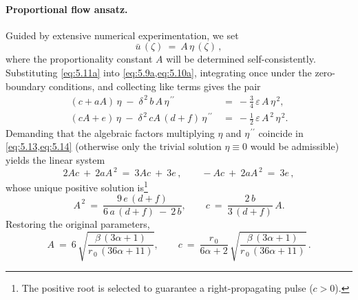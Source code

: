 \documentclass[alpha-refs, 12pt]{wiley-article}
\newcommand{\eps}{\varepsilon}
\begin{document}
\paragraph{Proportional flow ansatz.} Guided by extensive numerical experimentation, we set
\begin{equation}\label{eq:5.11a}
  \bar{u}\,(\zeta)\ =\ A\,\eta\,(\zeta)\,,
\end{equation}
where the proportionality constant $A$ will be determined self-consistently. Substituting \cref{eq:5.11a} into \cref{eq:5.9a,eq:5.10a}, integrating once under the zero-boundary conditions, and collecting like terms gives the pair
\begin{align}
  (c+aA)\,\eta \;-\;\delta^{\,2}\,b\,A\,\eta^{\,\prime\prime}\ &=\ -\frac{3}{4}\,\eps\,A\,\eta^{\,2}, \label{eq:5.13} \\
  (cA+e)\,\eta \;-\;\delta^{\,2}\,cA\,(d+f)\,\eta^{\,\prime\prime}\ &=\ -\frac{1}{2}\,\eps\,A^{\,2}\,\eta^{\,2}. \label{eq:5.14}
\end{align}
Demanding that the algebraic factors multiplying $\eta$ and $\eta^{\,\prime\prime}$ coincide in \cref{eq:5.13,eq:5.14} (otherwise only the trivial solution $\eta\equiv0$ would be admissible) yields the linear system
\begin{equation}\label{eq:compat}
  2Ac\ +\ 2aA^{\,2}\ =\ 3Ac\ +\ 3e\,, \qquad -Ac\ +\ 2aA^{\,2}\ =\ 3e\,,
\end{equation}
whose unique positive solution is\footnote{The positive root is selected to guarantee a right-propagating pulse ($c>0$).}
\begin{equation*}
  A^{\,2}\ =\ \frac{9\,e\,(d+f)}{6\,a\,(d+f)\ -\ 2\,b}, \qquad c\ =\ \frac{2\,b}{3\,(d+f)}\,A.
\end{equation*}
Restoring the original parameters,
\begin{equation*}
  A\ =\ 6\,\sqrt{\frac{\beta\,(3\alpha+1)}{r_{\,0}\,(36\alpha+11)}}, \qquad
  c\ =\ \frac{r_{\,0}}{6\alpha+2}\,\sqrt{\frac{\beta\,(3\alpha+1)}{r_{\,0}\,(36\alpha+11)}}\,.
\end{equation*}
\end{document}
